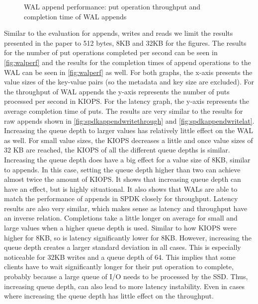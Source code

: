 \begin{figure}[!ht]
    \hspace*{-0.075\textwidth} %
    \raggedleft
    \caption{ WAL append performance: put operation throughput and completion time of WAL appends }
    \label{fig:walperf}
\end{figure}

Similar to the evaluation for appends, writes and reads we limit the results presented in the paper to 512 bytes, 8KB and 32KB for the figures. The results for the number of put operations completed per second can be seen in \autoref{fig:walperf} and the results for the completion times of append operations to the WAL can be seen in \autoref{fig:walperf} as well. For both graphs, the x-axis presents the value sizes of the key-value pairs (so the metadata and key size are excluded). For the throughput of WAL appends the y-axis represents the number of puts processed per second in KIOPS. For the latency graph, the y-axis represents the average completion time of puts. The results are very similar to the results for raw appends shown in \autoref{fig:spdkappendwritethrough} and \autoref{fig:spdkappendwritelat}. Increasing the queue depth to larger values has relatively little effect on the WAL as well. For small value sizes, the KIOPS decreases a little and once value sizes of 32 KB are reached, the KIOPS of all the different queue depths is similar. Increasing the queue depth does have a big effect for a value size of 8KB, similar to appends. In this case, setting the queue depth higher than two can achieve almost twice the amount of KIOPS. It shows that increasing queue depth can have an effect, but is highly situational. It also shows that WALs are able to match the performance of appends in SPDK closely for throughput. 
Latency results are also very similar, which makes sense as latency and throughput have an inverse relation. Completions take a little longer on average for small and large values when a higher queue depth is used. Similar to how KIOPS were higher for 8KB, so is latency significantly lower for 8KB. However, increasing the queue depth creates a larger standard deviation in all cases. This is especially noticeable for 32KB writes and a queue depth of 64. This implies that some clients have to wait significantly longer for their put operation to complete, probably because a large queue of I/O needs to be processed by the SSD. Thus, increasing queue depth, can also lead to more latency instability. Even in cases where increasing the queue depth has little effect on the throughput.



